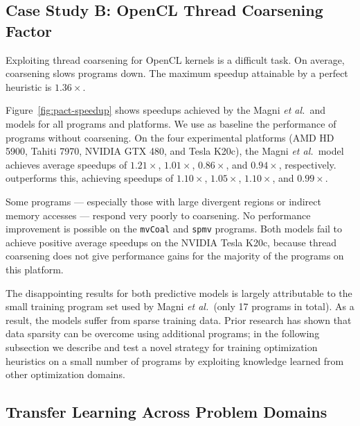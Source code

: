 



\subsection{Case Study B: OpenCL Thread Coarsening Factor}



Exploiting thread coarsening for OpenCL kernels is a difficult task. On average, coarsening slows programs down. The maximum speedup attainable by a perfect heuristic is $1.36\times$.

Figure~\ref{fig:pact-speedup} shows speedups achieved by the Magni \emph{et al.\ }and \DeepTune models for all programs and platforms. We use as baseline the performance of programs without coarsening.  On the four experimental platforms (AMD HD 5900, Tahiti 7970, NVIDIA GTX 480, and Tesla K20c), the Magni \emph{et al.\ }model achieves average speedups of $1.21\times$, $1.01\times$, $0.86\times$, and $0.94\times$, respectively. \DeepTune outperforms this, achieving speedups of $1.10\times$, $1.05\times$, $1.10\times$, and $0.99\times$.

Some programs --- especially those with large divergent regions or indirect memory accesses --- respond very poorly to coarsening. No performance improvement is possible on the \texttt{mvCoal} and \texttt{spmv} programs. Both models fail to achieve positive average speedups on the NVIDIA Tesla K20c, because thread coarsening does not give performance gains for the majority of the programs on this platform.


The disappointing results for both predictive models is largely attributable to the small training program set used by Magni \emph{et al.\ }(only 17 programs in total). As a result, the models suffer from sparse training data. Prior research has shown that data sparsity can be overcome using additional programs; in the following subsection we describe and test a novel strategy for training optimization heuristics on a small number of programs by exploiting knowledge learned from other optimization domains.


\subsection{Transfer Learning Across Problem Domains}\label{subsec:tl}

